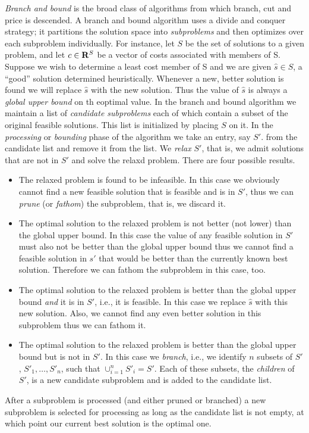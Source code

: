 {\em Branch and bound} is the broad class of algorithms from which
branch, cut and price is descended. A branch and bound algorithm uses
a divide and conquer strategy; it partitions the solution space into
{\em subproblems} and then optimizes over each subproblem 
individually. For instance, let $S$ be the set of solutions to a given
problem, and let $c \in {\bf R}^S$ be a vector of costs associated
with members of S. Suppose we wish to determine a least cost member of
S and we are given $\hat{s} \in S$, a ``good'' solution determined
heuristically. Whenever a new, better solution is found we will replace 
$\hat{s}$ with the new solution. Thus the value of $\hat{s}$ is always a
{\em global upper bound} on th eoptimal value.
In the branch and bound algorithm we maintain a list of 
{\em candidate subproblems} each of which contain 
a subset of the original feasible solutions. This list is
initialized by placing $S$ on it.
In the {\em processing} or {\em bounding} phase of the algorithm we take 
an entry, say $S'$. from the candidate list and remove it from the list.
We {\em relax} $S'$, that is, we admit solutions that are not in $S'$ and
solve the relaxd problem. There are four possible results. 
\begin{itemize}
\item The relaxed problem is found to be infeasible. In this case we 
  obviously cannot find a new feasible solution that is feasible and is in 
  $S'$, thus we can {\em prune} (or {\em fathom}) the subproblem, that is, we
  discard it.
\item The optimal solution to the relaxed problem is not better 
  (not lower) than the global upper bound. In this case the value of any
  feasible solution in $S'$ must also not be better than the global upper
  bound thus we cannot find a feasible solution in $s'$ that would be better
  than the currently known best solution. Therefore we can fathom the 
  subproblem in this case, too.
\item The optimal solution to the relaxed problem is better than the global
  upper bound {\em and} it is in $S'$, i.e., it is feasible. In this case we
  replace $\hat{s}$ with this new solution. Also, we cannot find any even
  better solution in this subproblem thus we can fathom it.
\item The optimal solution to the relaxed problem is better than the global
  upper bound but is not in $S'$. In this case we {\em branch}, i.e., we 
  identify $n$ subsets of 
  $S'$, $S'_1, \ldots, S'_n$, such that $\cup_{i = 1}^n S'_i = S'$. 
  Each of these subsets, the {\em children} of $S'$, is a new candidate
  subproblem and is added to the candidate list. 
\end{itemize}
After a subproblem is processed (and either pruned or branched) a new
subproblem is 
selected for processing as long as the candidate list is not empty, at 
which point our current best solution is the optimal one.

